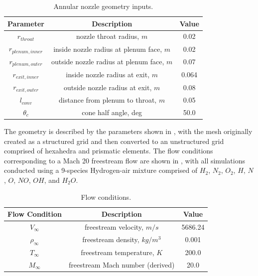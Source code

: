 \begin{table}[h]
  \centering
  \begin{tabular}{c|c|c}
    Parameter & Description & Value \\
    \hline
    $r_{throat}$       &   nozzle throat radius, $m$                 & 0.02 \\
    $r_{plenum,inner}$ &   inside nozzle radius at plenum face, $m$  & 0.02 \\
    $r_{plenum,outer}$ &   outside nozzle radius at plenum face, $m$ & 0.07 \\
    $r_{exit,inner}$   &   inside nozzle radius at exit, $m$         & 0.064 \\
    $r_{exit,outer}$   &   outside nozzle radius at exit, $m$        & 0.08 \\
    $l_{conv}$         &   distance from plenum to throat, $m$       & 0.05 \\
    $\theta_c$         &   cone half angle, deg                      & 50.0
  \end{tabular}
  \caption{Annular nozzle geometry inputs.}
  \label{tab:annular-geom}
\end{table}
The geometry is described by the parameters shown in ,
with the mesh originally created as a structured grid and then converted to an
unstructured grid comprised of hexahedra and prismatic elements.  The flow
conditions corresponding to a Mach 20 freestream flow are shown in
, with all simulations conducted using a 9-species
Hydrogen-air mixture comprised of $H_2$, $N_2$, $O_2$, $H$, $N$, $O$, $NO$,
$OH$, and $H_2 O$.
\begin{table}[!h]
  \centering
  \begin{tabular}{c|c|c}
    Flow Condition & Description & Value \\
    \hline
    $V_{\infty}$    & freestream velocity, $m/s$        & 5686.24 \\
    $\rho_{\infty}$ & freestream density, $kg/m^3$      & 0.001 \\
    $T_{\infty}$    & freestream temperature, $K$       & 200.0 \\
    $M_{\infty}$    & freestream Mach number (derived)  & 20.0
  \end{tabular}
  \caption{Flow conditions.}
  \label{tab:flow-conditions}
\end{table}

